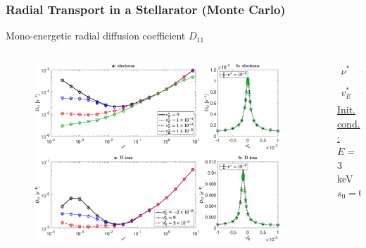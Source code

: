 \documentclass{beamer}
\newcommand{\bea}[1]{\begin{eqnarray} \label{#1}}
\newcommand{\eea}{\end{eqnarray}}
\begin{document}
\begin{frame}
\frametitle{Radial Transport in a Stellarator (Monte Carlo)}
\vspace{-0.8cm}
Mono-energetic radial diffusion coefficient $D_{11}$
\vspace{-0.8cm}
\begin{columns}[t]
	\begin{column}{0.85\textwidth}
		\begin{figure}
\hspace*{-0.5cm}\includegraphics[trim={3cm 1cm 3cm 1cm},clip,width=0.95\textwidth]{FIGURES/transport_coefficient_electrons_dions.eps}

\end{figure}
\end{column}
\hspace*{-1cm}
\begin{column}{0.2\textwidth}
\vspace{0.4cm}
	\bea*{} 
		\nu^{\ast} &=& \frac{R_0 \nu_c}{\iota v} \nonumber \\
		\quad \nonumber \\ 
		v_E^{\ast} &=& \frac{E_r}{v B_0} \nonumber
	\eea
	\vspace{0.1cm}
	\underline{Init. cond.:}\\
	\vspace{0.2cm}
	$E=$ 3 keV\\
	\vspace{0.2cm}
	$s_0 = 0.6$
	\end{column}
\end{columns}

\end{frame}
\end{document}
